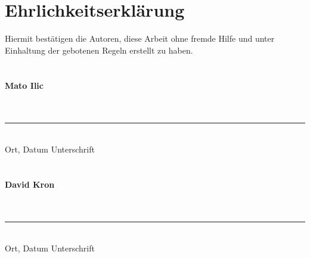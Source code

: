 \documentclass[listof=totocnumbered,bibliography=totocnumbered,12pt,oneside]{scrreprt}
\numberwithin{equation}{subsection}
\begin{document}
\newpage
\chapter{Ehrlichkeitserklärung}
Hiermit bestätigen die Autoren, diese Arbeit ohne fremde Hilfe und unter Einhaltung der gebotenen Regeln erstellt zu haben.
\\
\\
\\
\textbf{Mato Ilic}
\\
\\
\\
\rule{0.85\textwidth}{0.4pt} \\
Ort, Datum \hspace * {5cm} Unterschrift
\\
\\
\\
\textbf{David Kron}
\\
\\
\\
\rule{0.85\textwidth}{0.4pt} \\
Ort, Datum \hspace * {5cm} Unterschrift
\end{document}
